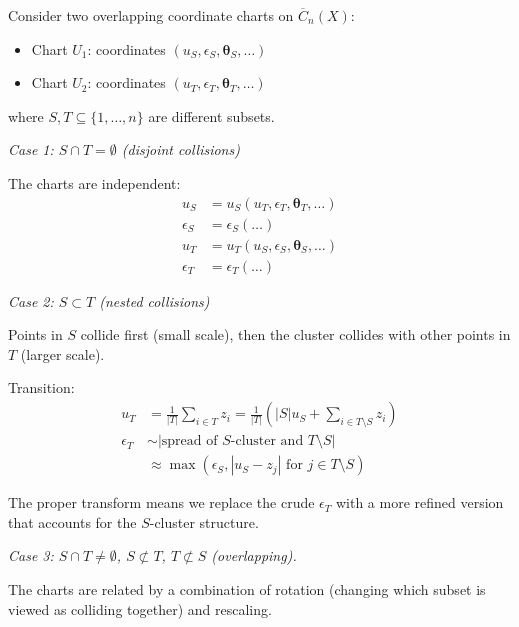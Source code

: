 \begin{proposition}\label{prop:transition-functions}
Consider two overlapping coordinate charts on $\overline{C}_n(X)$:
\begin{itemize}
\item Chart $U_1$: coordinates $(u_S, \epsilon_S, \boldsymbol{\theta}_S, \ldots)$
\item Chart $U_2$: coordinates $(u_T, \epsilon_T, \boldsymbol{\theta}_T, \ldots)$
\end{itemize}

where $S, T \subseteq \{1,\ldots,n\}$ are different subsets.

\emph{Case 1: $S \cap T = \emptyset$ (disjoint collisions)}

The charts are independent:
\begin{align}
u_S &= u_S(u_T, \epsilon_T, \boldsymbol{\theta}_T, \ldots)\\
\epsilon_S &= \epsilon_S(\ldots) \\
u_T &= u_T(u_S, \epsilon_S, \boldsymbol{\theta}_S, \ldots)\\
\epsilon_T &= \epsilon_T(\ldots)
\end{align}

\emph{Case 2: $S \subset T$ (nested collisions)}

Points in $S$ collide first (small scale), then the cluster collides with other points
in $T$ (larger scale).

Transition:
\begin{align}
u_T &= \frac{1}{|T|} \sum_{i \in T} z_i = \frac{1}{|T|}\left( |S| u_S + \sum_{i \in T \setminus S} z_i \right)\\
\epsilon_T &\sim |\text{spread of } S \text{-cluster and } T\setminus S| \\
&\approx \max(\epsilon_S, |u_S - z_j| \text{ for } j \in T\setminus S)
\end{align}

The proper transform means we replace the crude $\epsilon_T$ with a more refined version
that accounts for the $S$-cluster structure.

\emph{Case 3: $S \cap T \neq \emptyset$, $S \not\subset T$, $T \not\subset S$ (overlapping).}

The charts are related by a combination of
rotation (changing which subset is viewed as colliding together) and rescaling.
\end{proposition}

